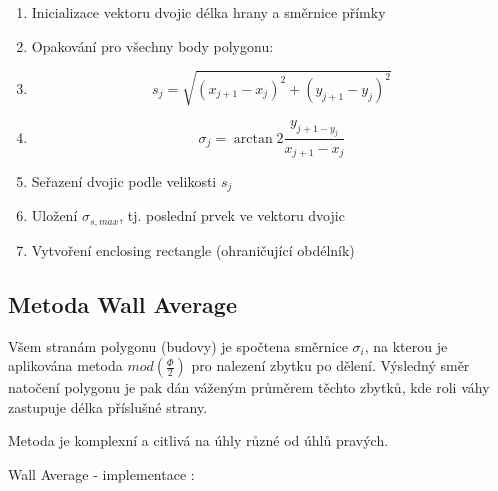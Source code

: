 \documentclass[oneside,12pt,a4paper]{book}
\begin{document}
\begin{enumerate}
\item Inicializace vektoru dvojic délka hrany a směrnice přímky
\item Opakování pro všechny body polygonu:
\item \quad \begin{equation}
    s_j = \sqrt{(x_{j+1}-x_j)^2 + (y_{j+1}-y_j)^2}
\end{equation}
\item \quad \quad \begin{equation}
    \sigma_j = \arctan2 \frac{y_{j+1-y_j}}{x_{j+1}-x_j}
\end{equation}
\item Seřazení dvojic podle velikosti $s_j$
\item Uložení $\sigma_{s,max}$, tj. poslední prvek ve vektoru dvojic
\item Vytvoření enclosing rectangle (ohraničující obdélník)
\end{enumerate}

\bigskip


\subsection{Metoda Wall Average}
Všem stranám polygonu (budovy) je spočtena směrnice $\sigma_i$, na kterou je aplikována metoda $mod(\frac{\Phi}{2})$ pro nalezení zbytku po dělení. Výsledný směr natočení polygonu je pak dán váženým průměrem těchto zbytků, kde roli váhy zastupuje délka příslušné strany.\par
Metoda je komplexní a citlivá na úhly různé od úhlů pravých.\par

\bigskip

Wall Average - implementace $:$
\end{document}
